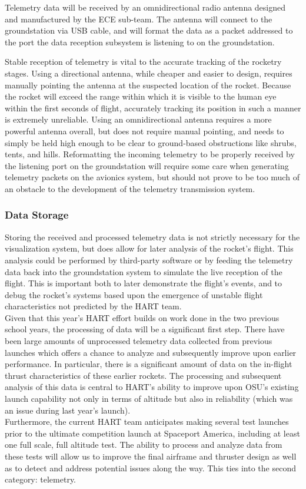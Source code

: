 \documentclass[onecolumn, draftclsnofoot,10pt, compsoc]{IEEEtran}
\begin{document}
Telemetry data will be received by an omnidirectional radio antenna designed and manufactured by the ECE sub-team.
The antenna will connect to the groundstation via USB cable, and will format the data as a packet addressed to the port the data reception subsystem is listening to on the groundstation.

Stable reception of telemetry is vital to the accurate tracking of the rocketry stages.
Using a directional antenna, while cheaper and easier to design, requires manually pointing the antenna at the suspected location of the rocket.
Because the rocket will exceed the range within which it is visible to the human eye within the first seconds of flight, accurately tracking its position in such a manner is extremely unreliable.
Using an omnidirectional antenna requires a more powerful antenna overall, but does not require manual pointing, and needs to simply be held high enough to be clear to ground-based obstructions like shrubs, tents, and hills.
Reformatting the incoming telemetry to be properly received by the listening port on the groundstation will require some care when generating telemetry packets on the avionics system, but should not prove to be too much of an obstacle to the development of the telemetry transmission system.


\subsubsection{Data Storage}
Storing the received and processed telemetry data is not strictly necessary for the visualization system, but does allow for later analysis of the rocket's flight.
This analysis could be performed by third-party software or by feeding the telemetry data back into the groundstation system to simulate the live reception of the flight.
This is important both to later demonstrate the flight's events, and to debug the rocket's systems based upon the emergence of unstable flight characteristics not predicted by the HART team.\\
\noindent
Given that this year's HART effort builds on work done in the two previous school years, the processing of data will be a significant first step. 
There have been large amounts of unprocessed telemetry data collected from previous launches which offers a chance to analyze and subsequently improve upon earlier performance. 
In particular, there is a significant amount of data on the in-flight thrust characteristics of these earlier rockets. 
The processing and subsequent analysis of this data is central to HART's ability to improve upon OSU's existing launch capability not only in terms of altitude but also in reliability (which was an issue during last year's launch).\\
\noindent
Furthermore, the current HART team anticipates making several test launches prior to the ultimate competition launch at Spaceport America, including at least one full scale, full altitude test. 
The ability to process and analyze data from these tests will allow us to improve the final airframe and thruster design as well as to detect and address potential issues along the way. 
This ties into the second category: telemetry.
\end{document}
